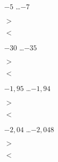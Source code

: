  
\begin{QCM}
  \begin{GroupeQCM}   
    \begin{exercice}
      $-5$ \ldots $-7$
      \begin{ChoixQCM}{4}
      \item $>$
      \item $<$
      \end{ChoixQCM}
\begin{corrige}
   \end{corrige}
    \end{exercice}
    

    
    \begin{exercice}
      $-30$ \ldots $-35$
      \begin{ChoixQCM}{4}
      \item $>$
      \item $<$
      \end{ChoixQCM}
\begin{corrige}
   \end{corrige}
    \end{exercice}
    \begin{exercice}
      $-1,95$ \ldots $-1,94$
      \begin{ChoixQCM}{4}
      \item $>$
      \item $<$
      \end{ChoixQCM}
\begin{corrige}
   \end{corrige}
    \end{exercice}
    
    
    \begin{exercice}
      $-2,04$ \ldots $-2,048$
      \begin{ChoixQCM}{4}
      \item $>$
      \item $<$
      \end{ChoixQCM}
\begin{corrige}
   \end{corrige}
    \end{exercice} 

\end{GroupeQCM}
\end{QCM}

  
